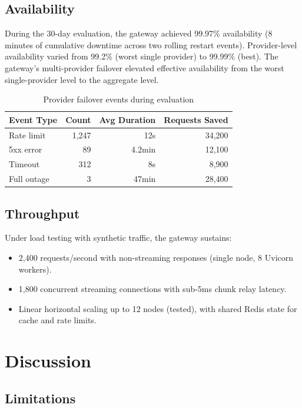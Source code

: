 \documentclass[11pt,twocolumn]{article}
\begin{document}
\subsection{Availability}

During the 30-day evaluation, the gateway achieved 99.97\% availability (8 minutes of cumulative downtime across two rolling restart events). Provider-level availability varied from 99.2\% (worst single provider) to 99.99\% (best). The gateway's multi-provider failover elevated effective availability from the worst single-provider level to the aggregate level.

\begin{table}[t]
\centering
\caption{Provider failover events during evaluation}
\label{tab:failover}
\begin{tabular}{@{}lrrr@{}}
\toprule
\textbf{Event Type} & \textbf{Count} & \textbf{Avg Duration} & \textbf{Requests Saved} \\
\midrule
Rate limit & 1,247 & 12s & 34,200 \\
5xx error & 89 & 4.2min & 12,100 \\
Timeout & 312 & 8s & 8,900 \\
Full outage & 3 & 47min & 28,400 \\
\bottomrule
\end{tabular}
\end{table}

\subsection{Throughput}

Under load testing with synthetic traffic, the gateway sustains:

\begin{itemize}[leftmargin=*]
    \item 2,400 requests/second with non-streaming responses (single node, 8 Uvicorn workers).
    \item 1,800 concurrent streaming connections with sub-5ms chunk relay latency.
    \item Linear horizontal scaling up to 12 nodes (tested), with shared Redis state for cache and rate limits.
\end{itemize}

\section{Discussion}
\label{sec:discussion}

\subsection{Limitations}
\end{document}
